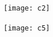 \documentclass[12pt]{article}
\begin{document}
\hfill\texttt{[image: c2]}\hfill~

\hfill\texttt{[image: c5]}\hfill~
\end{document}
